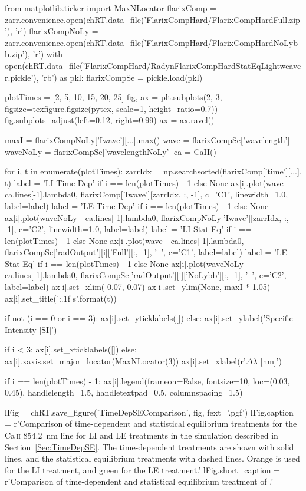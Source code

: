 
\begin{pycode}[TimeDepRT]
from matplotlib.ticker import MaxNLocator
flarixComp = zarr.convenience.open(chRT.data_file('FlarixCompHard/FlarixCompHardFull.zip'), 'r')
flarixCompNoLy = zarr.convenience.open(chRT.data_file('FlarixCompHard/FlarixCompHardNoLybb.zip'), 'r')
with open(chRT.data_file('FlarixCompHard/RadynFlarixCompHardStatEqLightweaver.pickle'), 'rb') as pkl:
    flarixCompSe = pickle.load(pkl)

plotTimes = [2, 5, 10, 15, 20, 25]
fig, ax = plt.subplots(2, 3, figsize=texfigure.figsize(pytex, scale=1, height_ratio=0.7))
fig.subplots_adjust(left=0.12, right=0.99)
ax = ax.ravel()

maxI = flarixCompNoLy['Iwave'][...].max()
wave = flarixCompSe['wavelength']
waveNoLy = flarixCompSe['wavelengthNoLy']
ca = CaII()

for i, t in enumerate(plotTimes):
    zarrIdx = np.searchsorted(flarixComp['time'][...], t)
    label = 'LI Time-Dep' if i == len(plotTimes) - 1 else None
    ax[i].plot(wave - ca.lines[-1].lambda0, flarixComp['Iwave'][zarrIdx, :, -1], c='C1', linewidth=1.0, label=label)
    label = 'LE Time-Dep' if i == len(plotTimes) - 1 else None
    ax[i].plot(waveNoLy - ca.lines[-1].lambda0, flarixCompNoLy['Iwave'][zarrIdx, :, -1], c='C2', linewidth=1.0, label=label)
    label = 'LI Stat Eq' if i == len(plotTimes) - 1 else None
    ax[i].plot(wave - ca.lines[-1].lambda0, flarixCompSe['radOutput'][i]['Full'][:, -1], '--', c='C1', label=label)
    label = 'LE Stat Eq' if i == len(plotTimes) - 1 else None
    ax[i].plot(waveNoLy - ca.lines[-1].lambda0, flarixCompSe['radOutput'][i]['NoLybb'][:, -1], '--', c='C2', label=label)
    ax[i].set_xlim(-0.07, 0.07)
    ax[i].set_ylim(None, maxI * 1.05)
    ax[i].set_title('{:.1f} s'.format(t))

    if not (i == 0 or i == 3):
        ax[i].set_yticklabels([])
    else:
        ax[i].set_ylabel('Specific Intensity [SI]')

    if i < 3:
        ax[i].set_xticklabels([])
    else:
        ax[i].xaxis.set_major_locator(MaxNLocator(3))
        ax[i].set_xlabel(r'$\Delta\lambda$ [nm]')

    if i == len(plotTimes) - 1:
        ax[i].legend(frameon=False, fontsize=10, loc=(0.03, 0.45),
                     handlelength=1.5, handletextpad=0.5, columnspacing=1.5)

lFig = chRT.save_figure('TimeDepSEComparison', fig, fext='.pgf')
lFig.caption = r'Comparison of time-dependent and statistical equilibrium treatments for the Ca\,\textsc{ii} \SI{854.2}{\nano\metre} line for LI and LE treatments in the simulation described in Section~\ref{Sec:TimeDepSE}. The time-dependent treatments are shown with solid lines, and the statistical equilibrium treatments with dashed lines. Orange is used for the LI treatment, and green for the LE treatment.'
lFig.short_caption = r'Comparison of time-dependent and statistical equilibrium treatment of \CaLine{}.'
\end{pycode}

